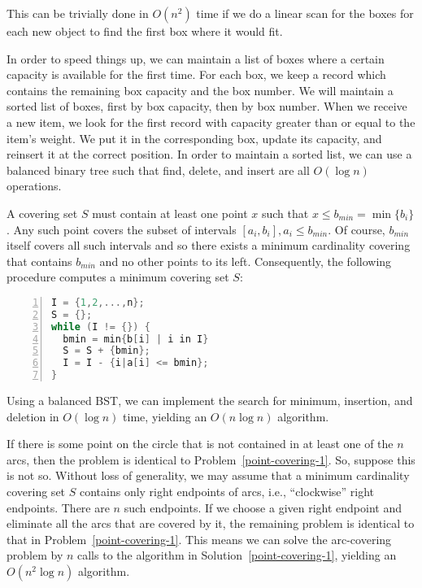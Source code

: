 This can be trivially done in $O(n^2)$ time if we do a linear scan for
the boxes for each new object to find the first box where it would fit.

In order to speed things up, we can maintain a list of boxes where a
certain capacity is available for the first time.  For each box, we
keep a record which contains the remaining box capacity and the box
number. We will maintain a sorted list of boxes, first by box capacity,
then by box number. When we receive a new item, we look for the first
record with capacity greater than or equal to the item's weight. We put it
in the corresponding box, update its capacity, and reinsert it at the
correct position. In order to maintain a sorted list, we can use a
balanced binary tree such that find, delete, and insert are all
$O(\log n)$ operations.

A covering set $S$ must contain at least one point $x$
such that $x \leq b_{min} = \min\{b_i\}$. Any such point covers the subset 
of intervals $[a_i,b_i], a_i \leq b_{min}$. Of course, $b_{min}$ itself covers
all such intervals and so there exists a minimum cardinality covering
that contains $b_{min}$ and no other points to its left. Consequently,
the following procedure computes a minimum covering set $S$:

\begin{lstlisting}[basicstyle=\footnotesize,numbers=left,breaklines=true,language=C++]
I = {1,2,...,n};
S = {};
while (I != {}) {
  bmin = min{b[i] | i in I}
  S = S + {bmin};
  I = I - {i|a[i] <= bmin};
}
\end{lstlisting}

Using a balanced BST, we can implement the search for minimum, insertion, and deletion in $O(\log n)$ time, yielding an $O(n\log n)$ algorithm.

If there is some point on the circle that is not contained in at least one
of the $n$ arcs, then the problem is identical to Problem~\ref{point-covering-1}.
So, suppose this is not so.  Without loss of generality, we may assume that a minimum
cardinality covering set $S$ contains only right endpoints of arcs, i.e., ``clockwise''
right endpoints. There are $n$ such endpoints.  If we choose a given right endpoint
and eliminate all the arcs that are covered by it, the remaining problem
is identical to that in Problem~\ref{point-covering-1}. This means we
can solve the arc-covering problem by $n$ calls to the algorithm 
in Solution~\ref{point-covering-1}, yielding an $O(n^2 \log n)$
algorithm.

